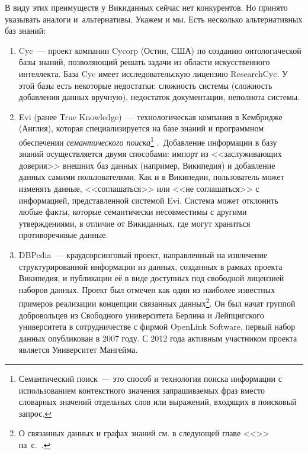 В виду этих преимуществ у Викиданных сейчас нет конкурентов. 
Но принято указывать аналоги и~альтернативы. Укажем и мы. Есть несколько альтернативных баз знаний:
\begin{enumerate}
\item Cyc~--- проект компании Cycorp (Остин, США) по созданию онтологической базы знаний, 
    позволяющий решать задачи из области искусственного интеллекта. База Cyc имеет исследовательскую лицензию ResearchCyc. У этой базы есть некоторые недостатки: сложность системы (сложность добавления данных
вручную), недостаток документации, неполнота системы.
\item Evi (ранее True Knowledge)~--- 
    технологическая компания в Кембридже (Англия), 
        которая специализируется на базе знаний и программном обеспечении 
        \textit{семантического поиска}\footnote[][1\baselineskip]{%
            Семантический поиск~--- 
            это способ и технология поиска информации с использованием контекстного значения запрашиваемых фраз 
            вместо словарных значений отдельных слов или выражений, входящих в поисковый запрос.}%
.\,     Добавление информации в базу знаний осуществляется двумя способами: импорт из <<заслуживающих доверия>> внешних баз данных (например, Википедия) и добавление данных самими пользователями. Как и в Википедии, пользователь может изменять
данные, <<соглашаться>> или <<не соглашаться>> с информацией, представленной системой Evi. Система может отклонить любые факты, которые семантически несовместимы с другими утверждениями, в отличие от Викиданных, где могут
храниться противоречивые данные.
\item DBPedia~--- краудсорсинговый проект, 
    направленный на извлечение структурированной информации из данных, 
        созданных в рамках проекта Википедия, 
        и публикации её в виде доступных под свободной лицензией наборов данных. 
        Проект был отмечен как один из наиболее известных примеров реализации 
        концепции связанных данных\footnote[][]{%
%
О связанных данных и графах знаний см. в следующей главе <<>> на~с.~\pageref{ch:BucketsAndBalls}.%
%
}.      Он был начат группой добровольцев из Свободного университета Берлина и Лейпцигского университета 
        в сотрудничестве с фирмой OpenLink Software, первый набор данных опубликован в 2007 году. 
        С 2012 года активным участником проекта является Университет Мангейма.%
\end{enumerate}

